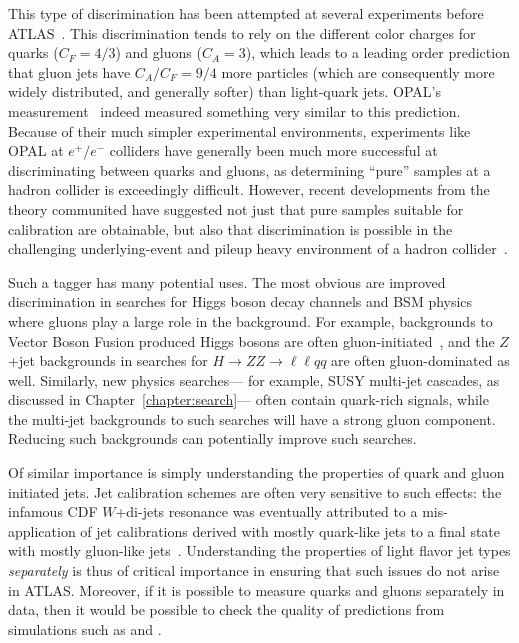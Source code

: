 This type of discrimination has been attempted at several experiments before ATLAS~\cite{TevatronShapes1,QGNN,Pumplin,QGopal,Ariel,QGsub,QGlep,QGcleo,DelphiQG,DelphiQG2,AlephQG,L3QG}. This discrimination tends to rely on the different color charges for quarks ($C_F=4/3$) and gluons ($C_A=3$), which leads to a leading order prediction that gluon jets have $C_A/C_F = 9/4$ more particles (which are consequently more widely distributed, and generally softer) than light-quark jets. OPAL's measurement~\cite{QGopal} indeed measured something very similar to this prediction. Because of their much simpler experimental environments, experiments like OPAL at $e^+/e^-$ colliders have generally been much more successful at discriminating between quarks and gluons, as determining ``pure'' samples at a hadron collider is exceedingly difficult. However, recent developments from the theory communited have suggested not just that pure samples suitable for calibration are obtainable, but also that discrimination is possible in the challenging underlying-event and pileup heavy environment of a hadron collider~\cite{schwartz1,schwartz2}. 

Such a tagger has many potential uses. The most obvious are improved discrimination in searches for Higgs boson decay channels and BSM physics where gluons play a large role in the background. For example, backgrounds to Vector Boson Fusion produced Higgs bosons are often gluon-initiated~\cite{CMS-PAS-HIG-13-011}, and the $Z$+jet backgrounds in searches for $H\rightarrow ZZ \rightarrow \ell \ell qq$ are often gluon-dominated as well. Similarly, new physics searches--- for example, SUSY multi-jet cascades, as discussed in Chapter~\ref{chapter:search}--- often contain quark-rich signals, while the multi-jet backgrounds to such searches will have a strong gluon component. Reducing such backgrounds can potentially improve such searches. 

Of similar importance is simply understanding the properties of quark and gluon initiated jets. Jet calibration schemes are often very sensitive to such effects: the infamous CDF $W$+di-jets resonance was eventually attributed to a mis-application of jet calibrations derived with mostly quark-like jets to a final state with mostly gluon-like jets~\cite{Aaltonen:2011mk}. Understanding the properties of light flavor jet types \textit{separately} is thus of critical importance in ensuring that such issues do not arise in ATLAS. Moreover, if it is possible to measure quarks and gluons separately in data, then it would be possible to check the quality of predictions from simulations such as \Pythia and \Herwigpp.

